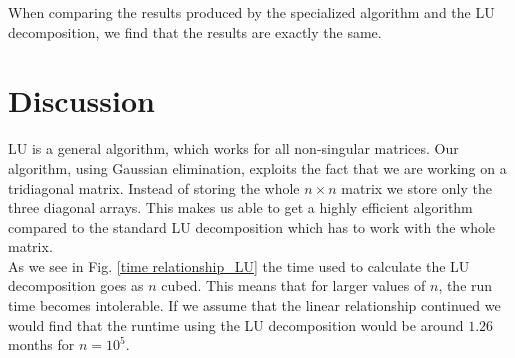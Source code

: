 \documentclass[%
 reprint,
nofootinbib,
 amsmath,amssymb,
 aps,
]{revtex4-1}
\begin{document}
When comparing the results produced by the specialized algorithm and the LU decomposition, we find that the results are exactly the same.

\section{Discussion}
LU is a general algorithm, which works for all non-singular matrices. Our algorithm, using Gaussian elimination, exploits the fact that we are working on a tridiagonal matrix. Instead of storing the whole $n\times n$ matrix we store only the three diagonal arrays. This makes us able to get a highly efficient algorithm compared to the standard LU decomposition which has to work with the whole matrix.\\
As we see in Fig. \vref{time relationship_LU} the time used to calculate the LU decomposition goes as $n$ cubed. This means that for larger values of $n$, the run time becomes intolerable. If we assume that the linear relationship continued we would find that the runtime using the LU decomposition would be around $1.26$ months for $n=10^5$.
\end{document}
